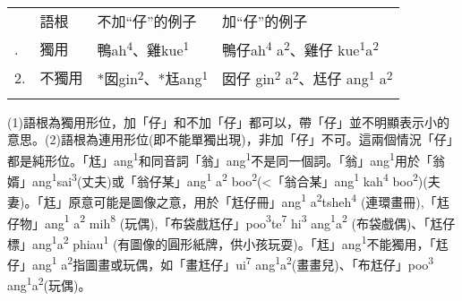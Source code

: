 \tabletail{}
\tablelasttail{}
\begin{tabularx}{\textwidth}{XXXX} & 語根 & 不加``仔''的例子 & 加``仔''的例子\\
\lsptoprule
1. & 獨用 & {\sffamily \textrm{鴨ah}\textrm{\textsuperscript{4}}\textrm{、雞kue}\textrm{\textsuperscript{1}}} & {\sffamily \textrm{鴨仔ah}\textrm{\textsuperscript{4}} \textrm{a}\textrm{\textsuperscript{2}}\textrm{、雞仔 kue}\textrm{\textsuperscript{1}}\textrm{a}\textrm{\textsuperscript{2}}}\\
2. & 不獨用 & {\sffamily \textrm{*囡gin}\textrm{\textsuperscript{2}}\textrm{、*尪ang}\textrm{\textsuperscript{1}}} & {\sffamily \textrm{囡仔 gin}\textrm{\textsuperscript{2}} \textrm{a}\textrm{\textsuperscript{2}}\textrm{、尪仔 ang}\textrm{\textsuperscript{1}} \textrm{a}\textrm{\textsuperscript{2}}}\\
\lspbottomrule
\end{tabularx}
\textrm{(1)語根為獨用形位，加「仔」和不加「仔」都可以，帶「仔」並不明顯表示小的意思。(2)語根為連用形位(即不能單獨出現)}，\textrm{非加「仔」不可。這兩個情況「仔」都是純形位。「尪」ang}\textrm{\textsuperscript{1}}\textrm{和同音詞「翁」ang}\textrm{\textsuperscript{1}}\textrm{不是同一個詞。「翁」ang}\textrm{\textsuperscript{1}}\textrm{用於「翁婿」ang}\textrm{\textsuperscript{1}}\textrm{sai}\textrm{\textsuperscript{3}}\textrm{(丈夫)或「翁仔某」ang}\textrm{\textsuperscript{1} }\textrm{a}\textrm{\textsuperscript{2}} \textrm{boo}\textrm{\textsuperscript{2}}\textrm{(<「翁合某」ang}\textrm{\textsuperscript{1}} \textrm{kah}\textrm{\textsuperscript{4}} \textrm{boo}\textrm{\textsuperscript{2}}\textrm{)(夫妻)}。\textrm{「尪」原意可能是圖像之意，用於「尪仔冊」ang}\textrm{\textsuperscript{1} }\textrm{a}\textrm{\textsuperscript{2}}\textrm{tsheh}\textrm{\textsuperscript{4}} \textrm{(連環畫冊)},\textrm{「尪仔物」ang}\textrm{\textsuperscript{1} }\textrm{a}\textrm{\textsuperscript{2} }\textrm{mih}\textrm{\textsuperscript{8}} \textrm{(玩偶),「布袋戲尪仔」poo}\textrm{\textsuperscript{3}}\textrm{te}\textrm{\textsuperscript{7}} \textrm{hi}\textrm{\textsuperscript{3}} \textrm{ang}\textrm{\textsuperscript{1}}\textrm{a}\textrm{\textsuperscript{2} }\textrm{(布袋戲偶)}、\textrm{「尪仔標」ang}\textrm{\textsuperscript{1}}\textrm{a}\textrm{\textsuperscript{2}} \textrm{phiau}\textrm{\textsuperscript{1}} \textrm{(有圖像的圓形紙牌，供小孩玩耍)}。\textrm{「尪」ang}\textrm{\textsuperscript{1}}\textrm{不能獨用，「尪仔」ang}\textrm{\textsuperscript{1} }\textrm{a}\textrm{\textsuperscript{2}}\textrm{指圖畫或玩偶，如「畫尪仔」ui}\textrm{\textsuperscript{7}} \textrm{ang}\textrm{\textsuperscript{1}}\textrm{a}\textrm{\textsuperscript{2}}\textrm{(畫畫兒)}、\textrm{「布尪仔」poo}\textrm{\textsuperscript{3}} \textrm{ang}\textrm{\textsuperscript{1}}\textrm{a}\textrm{\textsuperscript{2}}\textrm{(玩偶)}。

